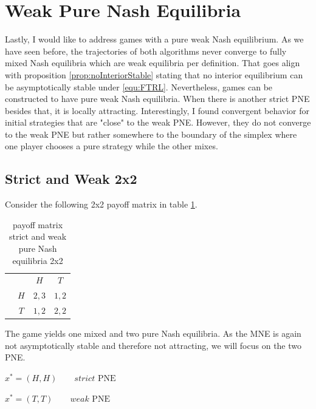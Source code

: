 \section{Weak Pure Nash Equilibria}\label{section:WeakPureNashEquilibria}

Lastly, I would like to address games with a pure weak Nash equilibrium. As we have seen before, the trajectories of both algorithms never converge to fully mixed Nash equilibria which are weak equilibria per definition. That goes align with proposition \ref{prop:noInteriorStable} stating that no interior equilibrium can be asymptotically stable under \ref{equ:FTRL}. Nevertheless, games can be constructed to have pure weak Nash equilibria. When there is another strict PNE besides that, it is locally attracting. Interestingly, I found convergent behavior for initial strategies that are "close" to the weak PNE. However, they do not converge to the weak PNE but rather somewhere to the boundary of the simplex where one player chooses a pure strategy while the other mixes. 

\subsection{Strict and Weak 2x2}\label{subsection:StrictAndWeak2x2}

Consider the following 2x2 payoff matrix in table \ref{tab:payoffStrictAndWeak2x2}.

\begin{table}[H]\centering
\setlength{\extrarowheight}{2pt}
\begin{tabular}{cc|c|c|}
  & \multicolumn{1}{c}{} & \multicolumn{1}{c}{$H$}  & \multicolumn{1}{c}{$T$} \\\cline{3-4}
  & $H$ & $2,3$ & $1,2$ \\\cline{3-4}
  & $T$ & $1,2$ & $2,2$ \\\cline{3-4}
\end{tabular}\caption{\label{tab:payoffStrictAndWeak2x2}payoff matrix strict and weak pure Nash equilibria 2x2}
\end{table}

The game yields one mixed and two pure Nash equilibria. As the MNE is again not asymptotically stable and therefore not attracting, we will focus on the two PNE. 

\begin{description}\centering
    \item $x^{*} = (H,H) \qquad \textit{strict }\text{PNE}$
    \item $x^{*} = (T,T) \qquad \textit{weak }\text{PNE}$
\end{description}

